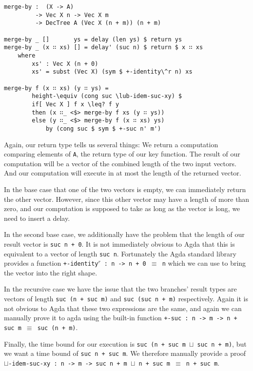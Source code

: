 \begin{lstlisting}[caption={Merging Sorted Vectors},label={lst:merge},emph={merge,by,DecTree,delay,return,delay',if,then,else}]
merge-by :  (X -> A)
         -> Vec X n -> Vec X m
         -> DecTree A (Vec X (n + m)) (n + m)

merge-by _ []       ys = delay (len ys) $ return ys
merge-by _ (x ∷ xs) [] = delay' (suc n) $ return $ x ∷ xs
    where
        xs' : Vec X (n + 0)
        xs' = subst (Vec X) (sym $ +-identity\^r n) xs

merge-by f (x ∷ xs) (y ∷ ys) =
        height-\equiv (cong suc \lub-idem-suc-xy) $
        if[ Vec X ] f x \leq? f y
        then (x ∷_ <$> merge-by f xs (y ∷ ys))
        else (y ∷_ <$> merge-by f (x ∷ xs) ys)
            by (cong suc $ sym $ +-suc n' m')
\end{lstlisting}

Again, our return type tells us several things: We return a computation comparing elements of \texttt{A}, the return type of our key function. The result of our computation will be a vector of the combined length of the two input vectors. And our computation will execute in at most the length of the returned vector.

In the base case that one of the two vectors is empty, we can immediately return the other vector. However, since this other vector may have a length of more than zero, and our computation is supposed to take as long as the vector is long, we need to insert a delay.

In the second base case, we additionally have the problem that the length of our result vector is \texttt{suc n + 0}. It is not immediately obvious to Agda that this is equivalent to a vector of length \texttt{suc n}. Fortunately the Agda standard library provides a function \texttt{+-identity$^r$ : n -> n + 0 $\equiv$ n} which we can use to bring the vector into the right shape.

In the recursive case we have the issue that the two branches' result types are vectors of length \texttt{suc (n + suc m)} and \texttt{suc (suc n + m)} respectively. Again it is not obvious to Agda that these two expressions are the same, and again we can manually prove it to agda using the built-in function \texttt{+-suc : n -> m -> n + suc m $\equiv$ suc (n + m)}.

Finally, the time bound for our execution is \texttt{suc (n + suc m $\sqcup$ suc n + m)}, but we want a time bound of \texttt{suc n + suc m}. We therefore manually provide a proof \texttt{$\sqcup$-idem-suc-xy : n -> m -> suc n + m $\sqcup$ n + suc m $\equiv$ n + suc m}.

